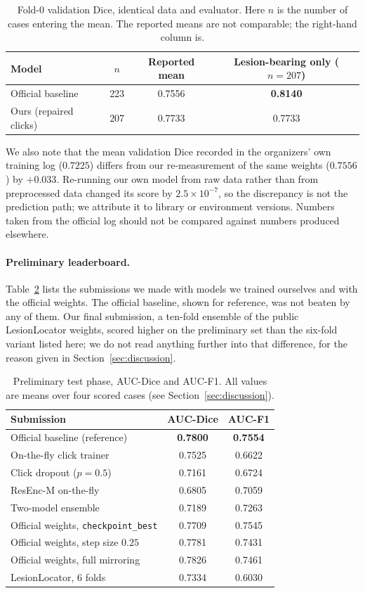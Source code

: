 \documentclass[runningheads]{llncs}
\begin{document}
\begin{table}[t]
\caption{Fold-0 validation Dice, identical data and evaluator. Here $n$ is the
number of cases entering the mean. The reported means are not comparable; the
right-hand column is.}
\label{tab:val}
\centering
\begin{tabular}{lccc}
\toprule
Model & $n$ & Reported mean & Lesion-bearing only ($n=207$) \\
\midrule
Official baseline & 223 & 0.7556 & \textbf{0.8140} \\
Ours (repaired clicks) & 207 & 0.7733 & 0.7733 \\
\bottomrule
\end{tabular}
\end{table}

We also note that the mean validation Dice recorded in the organizers' own
training log ($0.7225$) differs from our re-measurement of the same weights
($0.7556$) by $+0.033$. Re-running our own model from raw data rather than from
preprocessed data changed its score by $2.5\times10^{-7}$, so the discrepancy is
not the prediction path; we attribute it to library or environment versions.
Numbers taken from the official log should not be compared against numbers
produced elsewhere.

\paragraph{Preliminary leaderboard.}
Table~\ref{tab:lb} lists the submissions we made with models we trained
ourselves and with the official weights. The official baseline, shown for
reference, was not beaten by any of them. Our final submission, a ten-fold
ensemble of the public LesionLocator weights, scored higher on the preliminary
set than the six-fold variant listed here; we do not read anything further into
that difference, for the reason given in Section~\ref{sec:discussion}.

\begin{table}[t]
\caption{Preliminary test phase, AUC-Dice and AUC-F1. All values are means over
four scored cases (see Section~\ref{sec:discussion}).}
\label{tab:lb}
\centering
\begin{tabular}{lcc}
\toprule
Submission & AUC-Dice & AUC-F1 \\
\midrule
Official baseline (reference) & \textbf{0.7800} & \textbf{0.7554} \\
\midrule
On-the-fly click trainer & 0.7525 & 0.6622 \\
Click dropout ($p=0.5$) & 0.7161 & 0.6724 \\
ResEnc-M on-the-fly & 0.6805 & 0.7059 \\
Two-model ensemble & 0.7189 & 0.7263 \\
Official weights, \texttt{checkpoint\_best} & 0.7709 & 0.7545 \\
Official weights, step size $0.25$ & 0.7781 & 0.7431 \\
Official weights, full mirroring & 0.7826 & 0.7461 \\
LesionLocator, 6 folds & 0.7334 & 0.6030 \\
\bottomrule
\end{tabular}
\end{table}
\end{document}
